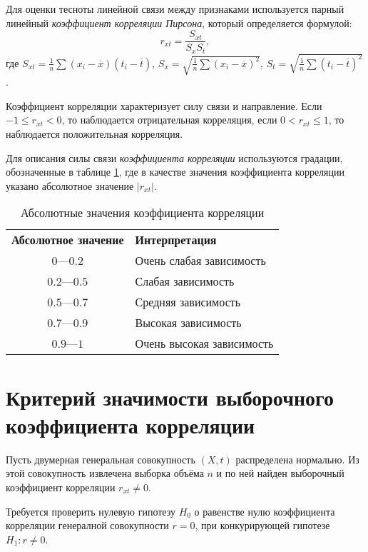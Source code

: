 Для оценки тесноты линейной связи между признаками используется парный линейный \textit{коэффициент корреляции Пирсона}, который определяется формулой:
\begin{equation}
\label{eq:correlation}
	r_{xt} = \frac{S_{xt}}{S_x S_t},
\end{equation}
где $S_{xt} = \frac{1}{n} \sum{(x_i - \overline{x})(t_i - \overline{t})}$, $S_x = \sqrt{\frac{1}{n} \sum{(x_i-\overline{x})^2}}$, $S_t = \sqrt{\frac{1}{n} \sum{(t_i - \overline{t})^2}}$.

Коэффициент корреляции характеризует силу связи и направление. Если $-1 \le r_{xt} < 0$, то наблюдается отрицательная корреляция, если $0 < r_{xt} \le 1$, то наблюдается положительная корреляция.

Для описания силы связи \textit{коэффициента корреляции} используются градации, обозначенные в таблице \ref{table:corr}, где в качестве значения коэффициента корреляции указано абсолютное значение $\vert r_{xt} \vert$.
\begin{center}
\begin{table}[ht]
\label{table:corr}
	\caption{Абсолютные значения коэффициента корреляции}
	\centering
	\begin{tabular}{c|l}
		\textbf{Абсолютное значение} & \textbf{Интерпретация} \\
		$0$---$0.2$ & Очень слабая зависимость \\
		$0.2$---$0.5$ & Слабая зависимость \\
		$0.5$---$0.7$ & Средняя зависимость \\
		$0.7$---$0.9$ & Высокая зависимость \\
		$0.9$---$1$ & Очень высокая зависимость \\
	\end{tabular}
\end{table}
\end{center}

\section*{Критерий значимости выборочного коэффициента корреляции} %
\label{subsec:sign_corr}

Пусть двумерная генеральная совокупность $(X, t)$ распределена нормально. Из этой совокупность извлечена выборка объёма $n$ и по ней найден выборочный коэффициент корреляции $r_{xt} \ne 0$.

Требуется проверить нулевую гипотезу $H_0$ о равенстве нулю коэффициента корреляции генералной совокупности $r = 0$, при конкурирующей гипотезе $H_1: r \ne 0$.

